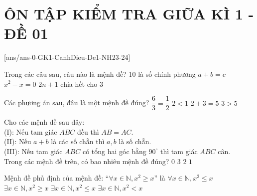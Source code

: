 \section*{ÔN TẬP KIỂM TRA GIỮA KÌ 1 - ĐỀ 01}
\setcounter{ex}{0}\setcounter{bt}{0}
[ans/ans-0-GK1-CanhDieu-De1-NH23-24]
\begin{ex}%
	Trong các câu sau, câu nào là mệnh đề?
	\choice
	{\True $10$ là số chính phương}
	{$a+b=c$}
	{$x^2-x=0$}
	{$2n+1$ chia hết cho $3$}
\end{ex}
\begin{ex}%
	Các phương án sau, đâu là một mệnh đề đúng?
	\choice
	{$\dfrac{6}{3}=\dfrac{1}{2}$}
	{$2<1$}
	{\True $2+3=5$}
	{$3>5$}
\end{ex}
\begin{ex}%
	Cho các mệnh đề sau đây:\\
	(I): Nếu tam giác $ABC$ đều thì $AB=AC$.\\
	(II): Nếu $a+b$ là các số chẵn thì $a,b$ là số chẵn.\\
	(III): Nếu tam giác $ABC$ có tổng hai góc bằng $90^{\circ}$ thì tam giác $ABC$ cân.\\
	Trong các mệnh đề trên, có bao nhiêu mệnh đề đúng?
	\choice
	{$0$}
	{$3$}
	{$2$}
	{\True $1$}
\end{ex}
\begin{ex}%
	Mệnh đề phủ định của mệnh đề: ``$\forall x \in \mathbb{N},x^2 \geq x$'' là
	\choice
	{$\forall x \in \mathbb{N},x^2 \leq x$}
	{$\exists x \in \mathbb{N},x^2 \geq x$}
	{$\exists x \in \mathbb{N},x^2 \leq x$}
	{\True $\exists x \in \mathbb{N},x^2<x$}
\end{ex}
